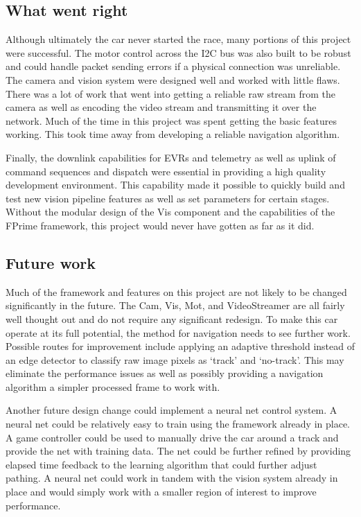 \documentclass{article}
\begin{document}
\subsection{What went right}

Although ultimately the car never started the race, many portions of this project were successful. The motor control across the I2C bus was also built to be robust and could handle packet sending errors if a physical connection was unreliable. The camera and vision system were designed well and worked with little flaws. There was a lot of work that went into getting a reliable raw stream from the camera as well as encoding the video stream and transmitting it over the network. Much of the time in this project was spent getting the basic features working. This took time away from developing a reliable navigation algorithm.

Finally, the downlink capabilities for EVRs and telemetry as well as uplink of command sequences and dispatch were essential in providing a high quality development environment. This capability made it possible to quickly build and test new vision pipeline features as well as set parameters for certain stages. Without the modular design of the Vis component and the capabilities of the FPrime framework, this project would never have gotten as far as it did.

\subsection{Future work}

Much of the framework and features on this project are not likely to be changed significantly in the future. The Cam, Vis, Mot, and VideoStreamer are all fairly well thought out and do not require any significant redesign. To make this car operate at its full potential, the method for navigation needs to see further work. Possible routes for improvement include applying an adaptive threshold instead of an edge detector to classify raw image pixels as `track' and `no-track'. This may eliminate the performance issues as well as possibly providing a navigation algorithm a simpler processed frame to work with.

Another future design change could implement a neural net control system. A neural net could be relatively easy to train using the framework already in place. A game controller could be used to manually drive the car around a track and provide the net with training data. The net could be further refined by providing elapsed time feedback to the learning algorithm that could further adjust pathing. A neural net could work in tandem with the vision system already in place and would simply work with a smaller region of interest to improve performance.
\end{document}
